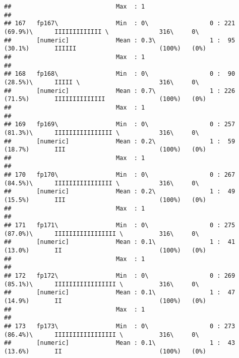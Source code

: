 \documentclass[]{article}
\begin{document}
\begin{verbatim}
##                             Max  : 1                                                                                       
## 
## 167   fp167\                Min  : 0\                 0 : 221 (69.9%)\      IIIIIIIIIIIII \              316\     0\       
##       [numeric]             Mean : 0.3\               1 :  95 (30.1%)       IIIIII                       (100%)   (0%)     
##                             Max  : 1                                                                                       
## 
## 168   fp168\                Min  : 0\                 0 :  90 (28.5%)\      IIIII \                      316\     0\       
##       [numeric]             Mean : 0.7\               1 : 226 (71.5%)       IIIIIIIIIIIIII               (100%)   (0%)     
##                             Max  : 1                                                                                       
## 
## 169   fp169\                Min  : 0\                 0 : 257 (81.3%)\      IIIIIIIIIIIIIIII \           316\     0\       
##       [numeric]             Mean : 0.2\               1 :  59 (18.7%)       III                          (100%)   (0%)     
##                             Max  : 1                                                                                       
## 
## 170   fp170\                Min  : 0\                 0 : 267 (84.5%)\      IIIIIIIIIIIIIIII \           316\     0\       
##       [numeric]             Mean : 0.2\               1 :  49 (15.5%)       III                          (100%)   (0%)     
##                             Max  : 1                                                                                       
## 
## 171   fp171\                Min  : 0\                 0 : 275 (87.0%)\      IIIIIIIIIIIIIIIII \          316\     0\       
##       [numeric]             Mean : 0.1\               1 :  41 (13.0%)       II                           (100%)   (0%)     
##                             Max  : 1                                                                                       
## 
## 172   fp172\                Min  : 0\                 0 : 269 (85.1%)\      IIIIIIIIIIIIIIIII \          316\     0\       
##       [numeric]             Mean : 0.1\               1 :  47 (14.9%)       II                           (100%)   (0%)     
##                             Max  : 1                                                                                       
## 
## 173   fp173\                Min  : 0\                 0 : 273 (86.4%)\      IIIIIIIIIIIIIIIII \          316\     0\       
##       [numeric]             Mean : 0.1\               1 :  43 (13.6%)       II                           (100%)   (0%)     

\end{verbatim}
\end{document}
